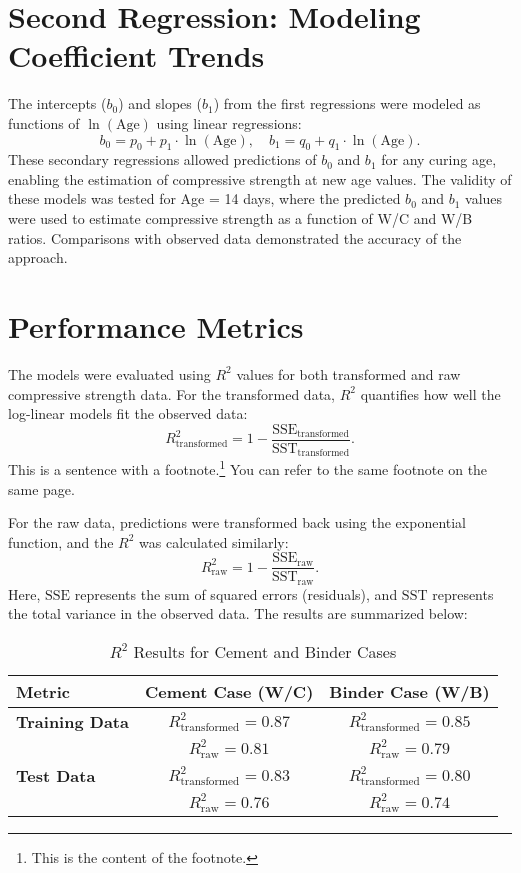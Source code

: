 \documentclass[a4paper,11pt]{article}
\begin{document}
\section*{Second Regression: Modeling Coefficient Trends}
The intercepts (\( b_0 \)) and slopes (\( b_1 \)) from the first regressions were modeled as functions of \( \ln(\text{Age}) \) using linear regressions:
\[
b_0 = p_0 + p_1 \cdot \ln(\text{Age}), \quad b_1 = q_0 + q_1 \cdot \ln(\text{Age}).
\]
These secondary regressions allowed predictions of \( b_0 \) and \( b_1 \) for any curing age, enabling the estimation of compressive strength at new age values. The validity of these models was tested for Age = 14 days, where the predicted \( b_0 \) and \( b_1 \) values were used to estimate compressive strength as a function of W/C and W/B ratios. Comparisons with observed data demonstrated the accuracy of the approach.

\section*{Performance Metrics}
The models were evaluated using \( R^2 \) values for both transformed and raw compressive strength data. For the transformed data, \( R^2 \) quantifies how well the log-linear models fit the observed data:
\[
R^2_{\text{transformed}} = 1 - \frac{\text{SSE}_{\text{transformed}}}{\text{SST}_{\text{transformed}}}.
\]
This is a sentence with a footnote.\footnote{This is the content of the footnote.\label{footnote:example}}
You can refer to the same footnote on the same page.


For the raw data, predictions were transformed back using the exponential function, and the \( R^2 \) was calculated similarly:
\[
R^2_{\text{raw}} = 1 - \frac{\text{SSE}_{\text{raw}}}{\text{SST}_{\text{raw}}}.
\]
Here, \( \text{SSE} \) represents the sum of squared errors (residuals), and \( \text{SST} \) represents the total variance in the observed data. The results are summarized below:

\begin{table}[h!]
\centering
\begin{tabular}{@{}lcc@{}}
\toprule
\textbf{Metric}           & \textbf{Cement Case (W/C)} & \textbf{Binder Case (W/B)} \\ \midrule
\textbf{Training Data}    & \( R^2_{\text{transformed}} = 0.87 \) & \( R^2_{\text{transformed}} = 0.85 \) \\
                          & \( R^2_{\text{raw}} = 0.81 \)         & \( R^2_{\text{raw}} = 0.79 \)         \\
\textbf{Test Data}        & \( R^2_{\text{transformed}} = 0.83 \) & \( R^2_{\text{transformed}} = 0.80 \) \\
                          & \( R^2_{\text{raw}} = 0.76 \)         & \( R^2_{\text{raw}} = 0.74 \)         \\ \bottomrule
\end{tabular}
\caption{\( R^2 \) Results for Cement and Binder Cases}
\end{table}
\end{document}
